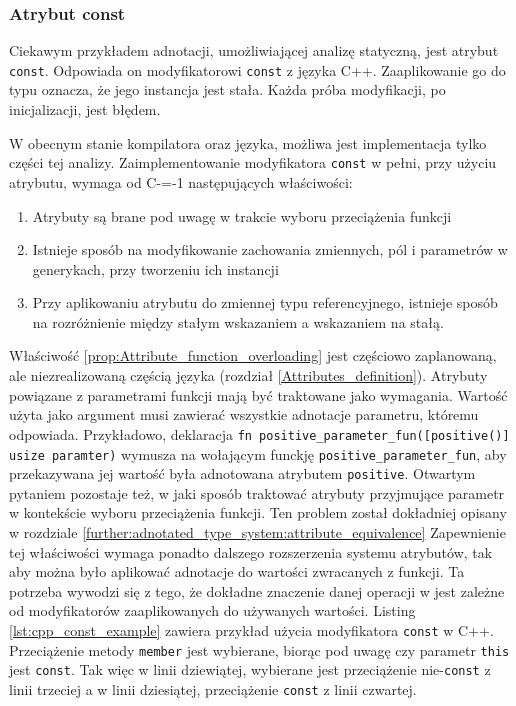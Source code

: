 \subsubsection{Atrybut const}
\label{const}
Ciekawym przykładem adnotacji, umożliwiającej analizę statyczną, jest atrybut \lstinline{const}.
Odpowiada on modyfikatorowi \lstinline{const} z języka C++.
Zaaplikowanie go do typu oznacza, że jego instancja jest stała.
Każda próba modyfikacji, po inicjalizacji, jest błędem.

W obecnym stanie kompilatora oraz języka, możliwa jest implementacja tylko części tej analizy.
Zaimplementowanie modyfikatora \lstinline{const} w pełni, przy użyciu atrybutu, wymaga od C-=-1 następujących właściwości:
\begin{enumerate}
  \item \label{prop:Attribute_function_overloading} Atrybuty są brane pod uwagę w trakcie wyboru przeciążenia funkcji
  \item \label{prop:Generic_adnotations} Istnieje sposób na modyfikowanie zachowania zmiennych, pól i parametrów w generykach, przy tworzeniu ich instancji
  \item \label{prop:Reference_adnotations} Przy aplikowaniu atrybutu do zmiennej typu referencyjnego, istnieje sposób na rozróżnienie między stałym wskazaniem a wskazaniem na stałą.
\end{enumerate}

Właściwość \ref{prop:Attribute_function_overloading} jest częściowo zaplanowaną, ale niezrealizowaną częścią języka (rozdział \ref{Attributes_definition}).
Atrybuty powiązane z parametrami funkcji mają być traktowane jako wymagania.
Wartość użyta jako argument musi zawierać wszystkie adnotacje parametru, któremu odpowiada. %
Przykładowo, deklaracja \lstinline{fn positive_parameter_fun([positive()] usize paramter)} wymusza na wołającym funckję \lstinline{positive_parameter_fun}, aby przekazywana jej wartość była adnotowana atrybutem \lstinline{positive}.
Otwartym pytaniem pozostaje też, w jaki sposób traktować atrybuty przyjmujące parametr w kontekście wyboru przeciążenia funkcji.
Ten problem został dokładniej opisany w rozdziale \ref{further:adnotated_type_system:attribute_equivalence}
Zapewnienie tej właściwości wymaga ponadto dalszego rozszerzenia systemu atrybutów, tak aby można było aplikować adnotacje do wartości zwracanych z funkcji.
Ta potrzeba wywodzi się z tego, że dokładne znaczenie danej operacji w jest zależne od modyfikatorów zaaplikowanych do używanych wartości.
Listing \ref{lst:cpp_const_example} zawiera przykład użycia modyfikatora \lstinline{const} w C++.
Przeciążenie metody \lstinline{member} jest wybierane, biorąc pod uwagę czy parametr \lstinline{this} jest \lstinline{const}.
Tak więc w linii dziewiątej, wybierane jest przeciążenie nie-\lstinline{const} z linii trzeciej a w linii dziesiątej, przeciążenie \lstinline{const} z linii czwartej.

